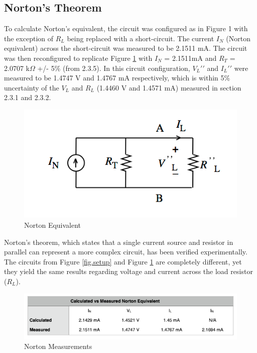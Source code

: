 \documentclass[12pt]{article}
\begin{document}
\subsection{Norton's Theorem}
To calculate Norton’s equivalent, the circuit was configured as in Figure 1 with the exception of $R_{L}$ being replaced with a short-circuit. The current $I_{N}$ (Norton equivalent) across the short-circuit was measured to be 2.1511 mA. The circuit was then reconfigured to replicate Figure \ref{fig.NortonEquivalent} with $I_{N}$ = 2.1511mA and $R_{T}$ = 2.0707 k$\Omega$ +/- 5\% (from 2.3.5). In this circuit configuration, $V_{L}\prime\prime$ and $I_{L}\prime\prime$ were measured to be 1.4747 V and 1.4767 mA respectively, which is within 5\% uncertainty of the $V_{L}$ and $R_{L}$ (1.4460 V and 1.4571 mA) measured in section 2.3.1 and 2.3.2.
\begin{figure}[htbp]
	\centering
	\includegraphics[scale=.65]{Norton.png}
	\caption{Norton Equivalent}
	\label{fig.NortonEquivalent}
\end{figure}

Norton’s theorem, which states that a single current source and resistor in parallel can represent a more complex circuit, has been verified experimentally. The circuits from Figure \ref{fig.setup} and Figure \ref{fig.NortonEquivalent} are completely different, yet they yield the same results regarding voltage and current across the load resistor ($R_{L}$).
\begin{figure}[htbp]
	\centering
	\includegraphics[scale=1]{NortonMeasurement.png}
	\caption{Norton Measurements}
	\label{fig.Norton}
\end{figure}
\end{document}

